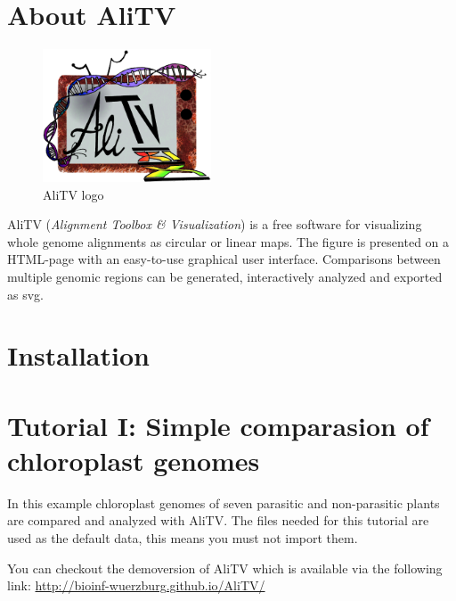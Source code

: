 \documentclass[a4paper]{scrartcl}
\begin{document}
\newpage
\section*{About AliTV}
\begin{figure}
\centering
\includegraphics[width=5cm]{ali_logo2.png}
\caption{AliTV logo}
\end{figure}

AliTV (\emph{Alignment Toolbox \& Visualization}) is a free software for visualizing whole genome alignments as circular or linear maps. The figure is presented on a HTML-page with an easy-to-use graphical user interface. Comparisons between multiple genomic regions can be generated, interactively analyzed and exported as svg. 

\section*{Installation}
\newpage
\section*{Tutorial I: Simple comparasion of chloroplast genomes}
In this example chloroplast genomes of seven parasitic and non-parasitic plants are compared and analyzed with AliTV. The files needed for this tutorial are used as the default data, this means you must not import them.

You can checkout the demoversion of AliTV which is available via the following link: \url{http://bioinf-wuerzburg.github.io/AliTV/}
\end{document}
